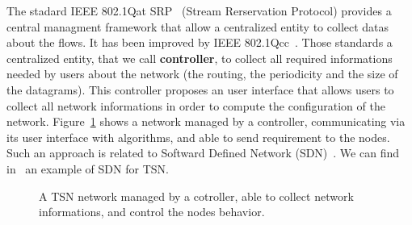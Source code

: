 The stadard IEEE 802.1Qat SRP~\cite{article} (Stream Rerservation Protocol) provides a central managment framework that allow a centralized entity to collect datas about the flows. It has been improved by IEEE 802.1Qcc~\cite{6755436}. Those standards a centralized entity, that we call \textbf{controller}, to collect all required informations needed by users about the network (the routing, the periodicity and the size of the datagrams). This controller proposes an user interface that allows users to collect all network informations in order to compute the configuration of the network. Figure~\ref{fig:networkcontroller} shows a network managed by a controller, communicating via its user interface with algorithms, and able to send requirement to the nodes. Such an approach is related to Softward Defined Network (SDN)~\cite{li2015software}. We can find in~\cite{7356556} an example of SDN for TSN.


\begin{figure}
\begin{center}


 \caption{A TSN network managed by a cotroller, able to collect network informations, and control the nodes behavior.}

\label{fig:networkcontroller}
\end{center}
\end{figure}


